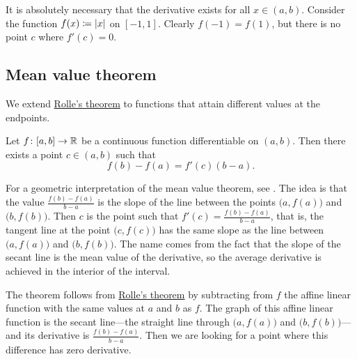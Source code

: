 It is absolutely necessary that the derivative exists for all $x
\in (a,b)$.  Consider the function $f(x) \coloneqq \lvert {x} \rvert$ on $[-1,1]$.
Clearly $f(-1) = f(1)$, but there is no point $c$ where $f'(c) = 0$.

\subsection{Mean value theorem}

We extend \hyperref[thm:rolle]{Rolle's theorem}
to functions that attain different
values at the endpoints.

\begin{thm} \label{thm:mvt}
Let $f \colon [a,b] \to {\mathbb{R}}$ be a continuous function
differentiable on $(a,b)$.  Then there exists a point $c \in (a,b)$
such that
\begin{equation*}
f(b)-f(a) = f'(c)(b-a) .
\end{equation*}
\end{thm}

For a geometric interpretation of the mean value theorem, see
.  The idea is that the value $\frac{f(b)-f(a)}{b-a}$
is the slope of the line between the points $\bigl(a,f(a)\bigr)$
and $\bigl(b,f(b)\bigr)$.
Then $c$ is the point such that $f'(c) = \frac{f(b)-f(a)}{b-a}$, that 
is, the tangent line at the point $\bigl(c,f(c)\bigr)$ has the same slope as the
line between $\bigl(a,f(a)\bigr)$ and $\bigl(b,f(b)\bigr)$.
The name comes from the fact that the slope of the secant line
is the mean value of the derivative, so the average derivative is achieved
in the interior of the interval.

The theorem follows from \hyperref[thm:rolle]{Rolle's theorem}
by subtracting from $f$ the affine linear function
with the same values at $a$ and $b$ as $f$.
The graph of this affine linear function is the 
secant line---the straight line through
$\bigl(a,f(a)\bigr)$ and $\bigl(b,f(b)\bigr)$---and
its derivative is
$\frac{f(b)-f(a)}{b-a}$.
Then we are looking for a point where this
difference has zero derivative.

\begin{myfigureht}
\caption{Graphical interpretation of the mean value theorem.\label{mvtfig}}
\end{myfigureht}



